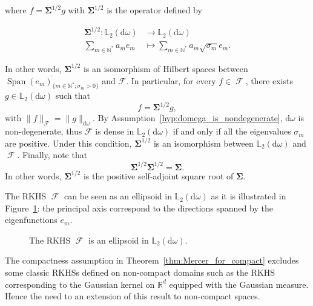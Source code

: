 \documentclass[twoside,11pt]{book}
\numberwithin{theorem}{chapter}
\numberwithin{definition}{chapter}
\numberwithin{proposition}{chapter}
\numberwithin{corollary}{chapter}
\numberwithin{example}{chapter}
\numberwithin{lemma}{chapter}
\numberwithin{assumption}{chapter}
\DeclareMathOperator{\Span}{\mathrm{Span}}
\DeclareMathOperator{\F}{\mathcal{F}}
\begin{document}
where $f = \bm{\Sigma}^{1/2}g$ with $\bm{\Sigma}^{1/2}$ is the operator defined by


\begin{align*}
\bm{\Sigma}^{1/2}: \mathbb{L}_{2}(\mathrm{d}\omega) & \longrightarrow \mathbb{L}_{2}(\mathrm{d}\omega) \\
 \sum\limits_{m \in \mathbb{N}^{*}} a_{m} e_m & \longmapsto \sum\limits_{m \in \mathbb{N}^{*}} a_m\sqrt{\sigma_{m}} e_{m}.
\end{align*}

 In other words, $\bm{\Sigma}^{1/2}$ is an isomorphism of Hilbert spaces between $\overline{\Span (e_{m})_{\{m \in \mathbb{N}^{*}; \sigma_m>0 \}}}$ and $\mathcal{F}$. In particular, for every $f \in \F$, there exists $g \in \mathbb{L}_{2}(\mathrm{d}\omega)$ such that
  \begin{equation}\label{eq:f_is_sigma_12_g}
  f = \bm{\Sigma}^{1/2}g,
  \end{equation}
  with $\|f\|_{\mathcal{F}} = \|g\|_{\mathrm{d}\omega}$. By Assumption~\ref{hyp:domega_is_nondegenerate}, $\mathrm{d}\omega$ is non-degenerate, thus $\mathcal{F}$ is dense in $\mathbb{L}_{2}(\mathrm{d}\omega)$ if and only if all the eigenvalues $\sigma_{m}$ are positive. Under this condition, $\bm{\Sigma}^{1/2}$ is an isomorphism between $\mathbb{L}_{2}(\mathrm{d}\omega)$ and $\F$. Finally, note that 
  \begin{equation}
  \bm{\Sigma}^{1/2} \bm{\Sigma}^{1/2} = \bm{\Sigma}.
  \end{equation}
  In other words, $\bm{\Sigma}^{1/2}$ is the positive self-adjoint square root of $\bm{\Sigma}$.


  The RKHS $\F$ can be seen as an ellipsoid in $\mathbb{L}_{2}(\mathrm{d}\omega)$ as it is illustrated in Figure~\ref{fig:rkhs_is_ellipsoid}: the principal axis correspond to the directions spanned by the eigenfunctions $e_{m}$.

\begin{figure}
    \centering
    \resizebox{0.6\textwidth}{!}{}
    \caption{The RKHS $\F$ is an ellipsoid in $\mathbb{L}_{2}(\mathrm{d}\omega)$. \label{fig:rkhs_is_ellipsoid}}
\end{figure}


The compactness assumption in Theorem~\ref{thm:Mercer_for_compact} excludes some classic RKHSs defined on non-compact domains such as the RKHS corresponding to the Gaussian kernel on $\mathbb{R}^{d}$ equipped with the Gaussian measure.
Hence the need to an extension of this result to non-compact spaces.
\end{document}

